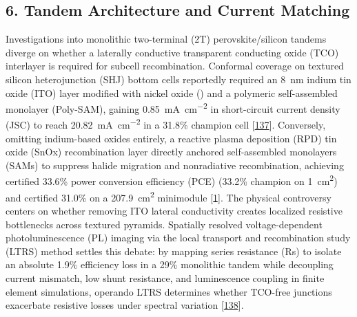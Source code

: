 \documentclass[
  11pt,
]{article}
\begin{document}
\subsection{6. Tandem Architecture and Current
Matching}\label{tandem-architecture-and-current-matching}

Investigations into monolithic two-terminal (2T) perovskite/silicon
tandems diverge on whether a laterally conductive transparent conducting
oxide (TCO) interlayer is required for subcell recombination. Conformal
coverage on textured silicon heterojunction (SHJ) bottom cells
reportedly required an \qty{8}{\nano\meter} indium tin oxide (ITO) layer
modified with nickel oxide () and a polymeric self-assembled
monolayer (Poly-SAM), gaining
\qty{0.85}{\milli\ampere\per\centi\meter\squared} in short-circuit
current density (JSC) to reach
\qty{20.82}{\milli\ampere\per\centi\meter\squared} in a 31.8\% champion
cell {[}\href{https://doi.org/10.1002/adfm.75311}{137}{]}. Conversely,
omitting indium-based oxides entirely, a reactive plasma deposition
(RPD) tin oxide (SnOx) recombination layer directly anchored
self-assembled monolayers (SAMs) to suppress halide migration and
nonradiative recombination, achieving certified 33.6\% power conversion
efficiency (PCE) (33.2\% champion on \qty{1}{\centi\meter\squared}) and
certified 31.0\% on a \qty{207.9}{\centi\meter\squared} minimodule
{[}\href{https://doi.org/10.1126/science.aef5355}{1}{]}. The physical
controversy centers on whether removing ITO lateral conductivity creates
localized resistive bottlenecks across textured pyramids. Spatially
resolved voltage-dependent photoluminescence (PL) imaging via the local
transport and recombination study (LTRS) method settles this debate: by
mapping series resistance (Rs) to isolate an absolute 1.9\% efficiency
loss in a 29\% monolithic tandem while decoupling current mismatch, low
shunt resistance, and luminescence coupling in finite element
simulations, operando LTRS determines whether TCO-free junctions
exacerbate resistive losses under spectral variation
{[}\href{https://doi.org/10.1002/smll.202513958}{138}{]}.
\end{document}
